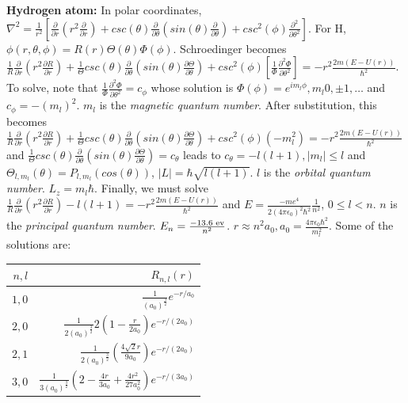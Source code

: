 {\bf Hydrogen atom:}  In polar coordinates,
$\nabla^2 = {\frac 1 {r^2}} [
{\frac {\partial} {\partial r}} (r^2 {\frac {\partial} {\partial r}}) +
csc(\theta) {\frac {\partial} {\partial \theta}} (sin(\theta) {\frac {\partial} {\partial \theta}})+
csc^2(\phi) {\frac {\partial^2} {\partial \theta^2}}]$.   For H,
$\phi(r, \theta, \phi)= R(r) \Theta(\theta) \Phi(\phi)$.
Schroedinger becomes
${\frac 1 {R}} {\frac {\partial} {\partial r}} (r^2 {\frac {\partial R} {\partial r}}) +
{\frac 1 {\Theta}} csc(\theta) {\frac {\partial} {\partial \theta}} (sin(\theta) 
{\frac {\partial \Theta} {\partial \theta}})+
csc^2(\phi) [ {\frac 1 {\Phi}} {\frac {\partial^2 \Phi} {\partial \theta^2}}] 
= -r^2 {\frac {2m(E-U(r))} {\hbar^2}}$.
To solve, note that
${\frac 1 {\Phi}} {\frac {\partial^2 \Phi} {\partial \theta^2}} = c_{\phi}$ whose solution is
$\Phi(\phi)= e^{i m_l \phi}, m_l 0, \pm 1, \ldots$ and $c_{\phi}= - (m_l)^2$.
$m_l$ is the \emph{magnetic quantum number}.
After substitution, this becomes
${\frac 1 {R}} {\frac {\partial} {\partial r}} (r^2 {\frac {\partial R} {\partial r}}) +
{\frac 1 {\Theta}} csc(\theta) {\frac {\partial} {\partial \theta}} (sin(\theta) 
{\frac {\partial \Theta} {\partial \theta}})+
csc^2(\phi) (-m_l^2) = -r^2 {\frac {2m(E-U(r))} {\hbar^2}}$ and
$ {\frac 1 {\Theta}} csc(\theta) {\frac {\partial} {\partial \theta}} (sin(\theta) 
{\frac {\partial \Theta} {\partial \theta}}) = c_{\theta}$ leads to
$c_{\theta}= -l(l+1), |m_l| \le l$ and
$\Theta_{l, m_l}(\theta) = P_{l, m_l}(cos(\theta))$, $|L|= \hbar \sqrt{l(l+1)}$.
$l$ is the \emph{orbital quantum number}.
$L_z = m_l \hbar$. 
Finally, we must solve
${\frac 1 {R}} {\frac {\partial} {\partial r}} (r^2 {\frac {\partial R} {\partial r}}) - l(l+1)
= -r^2 {\frac {2m(E-U(r))} {\hbar^2}}$  and 
$E= {\frac {-m e^4} {2(4 \pi \epsilon_0)^2 \hbar^2}} {\frac 1 {n^2}}$, $0 \le l < n$.
$n$ is the \emph{principal quantum number}.  $E_n= {\frac {-13.6 \textnormal{ ev}} {n^2}}$.
$r \approx n^2 a_0, a_0 = {\frac {4 \pi \epsilon_0 \hbar^2} {m_l^2}}$.  Some of the solutions
are:
\begin{center}
\begin{tabular} {| r | r |}
\hline
$n, l$ & $R_{n, l}(r)$ \\
\hline
$1,0$ & ${\frac 1 {(a_0)^{\frac 3 2}}} e^{-r/a_0}$ \\
\hline
$2,0$ & ${\frac 1 {2(a_0)^{\frac 3 2}}} 2(1- {\frac r {2 a_0}}) e^{-r/(2a_0)}$ \\
\hline
$2,1$ & ${\frac 1 {2(a_0)^{\frac 3 2}}} ({\frac  {4 \sqrt{2}r} {9 a_0}}) e^{-r/(2a_0)}$ \\
\hline
$3,0$ & ${\frac 1 {3(a_0)^{\frac 3 2}}} (2 - {\frac {4r} {3 a_0}} +
{\frac {4r^2} {27  a_0^2}}) e^{-r/(3a_0)}$ \\
\hline
\end{tabular}
\end{center}

